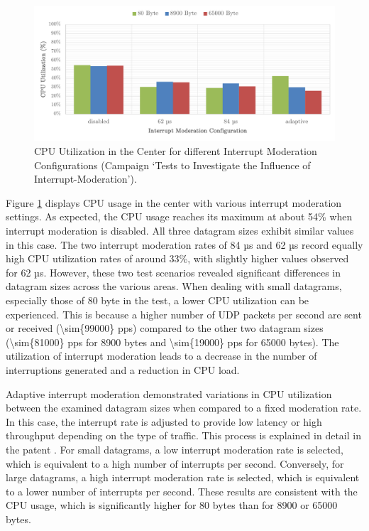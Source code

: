 \begin{figure}[h]
    \centering
    \includegraphics[width=1\linewidth]{figures/reliability/ihawk/diagr11.pdf}
    \caption{CPU Utilization in the Center for different Interrupt Moderation Configurations (Campaign `Tests to Investigate the Influence of Interrupt-Moderation').}
    \label{fig:diagr11CPU}
\end{figure}

Figure \ref{fig:diagr11CPU} displays CPU usage in the center with various interrupt moderation settings. As expected, the CPU usage reaches its maximum at about 54\% when interrupt moderation is disabled. All three datagram sizes exhibit similar values in this case. The two interrupt moderation rates of 84 µs and 62 µs record equally high CPU utilization rates of around 33\%, with slightly higher values observed for 62 µs. However, these two test scenarios revealed significant differences in datagram sizes across the various areas. When dealing with small datagrams, especially those of 80 byte in the test, a lower CPU utilization can be experienced. This is because a higher number of UDP packets per second are sent or received (\num{\sim{99000}} pps) compared to the other two datagram sizes (\num{\sim{81000}} pps for 8900 bytes and \num{\sim{19000}} pps for 65000 bytes). The utilization of interrupt moderation leads to a decrease in the number of interruptions generated and a reduction in CPU load.

Adaptive interrupt moderation demonstrated variations in CPU utilization between the examined datagram sizes when compared to a fixed moderation rate. In this case, the interrupt rate is adjusted to provide low latency or high throughput depending on the type of traffic. This process is explained in detail in the patent \cite{intermod04}. For small datagrams, a low interrupt moderation rate is selected, which is equivalent to a high number of interrupts per second. Conversely, for large datagrams, a high interrupt moderation rate is selected, which is equivalent to a lower number of interrupts per second. These results are consistent with the CPU usage, which is significantly higher for 80 bytes than for 8900 or 65000 bytes.

